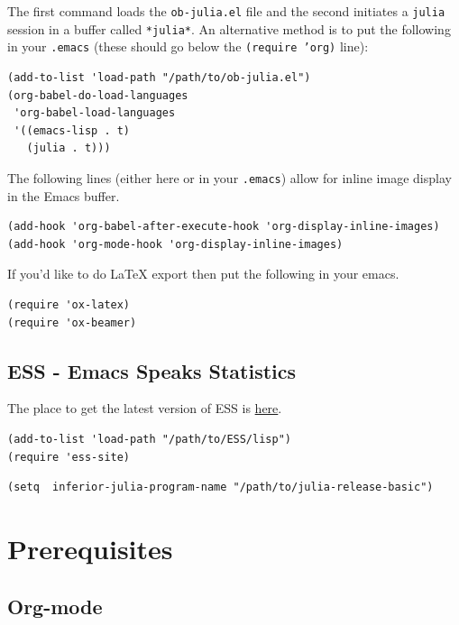 \documentclass[11pt]{article}
\begin{document}
The first command loads the \texttt{ob-julia.el} file and the second initiates a \texttt{julia} session in a buffer called \texttt{*julia*}.  An alternative method is to put the following in your \texttt{.emacs} (these should go below the \texttt{(require 'org)} line):

\begin{verbatim}
(add-to-list 'load-path "/path/to/ob-julia.el")
(org-babel-do-load-languages
 'org-babel-load-languages
 '((emacs-lisp . t)
   (julia . t)))
\end{verbatim}

The following lines (either here or in your \texttt{.emacs}) allow for inline image display in the Emacs buffer.

\begin{verbatim}
(add-hook 'org-babel-after-execute-hook 'org-display-inline-images)   
(add-hook 'org-mode-hook 'org-display-inline-images)
\end{verbatim}

If you'd like to do \LaTeX{} export then put the following in your emacs.

\begin{verbatim}
(require 'ox-latex)
(require 'ox-beamer)
\end{verbatim}
\subsection{ESS - Emacs Speaks Statistics}
\label{sec-1-4}

The place to get the latest version of ESS is \href{http://stat.ethz.ch/ESS/index.php?Section=download}{here}.  

\begin{verbatim}
(add-to-list 'load-path "/path/to/ESS/lisp")
(require 'ess-site)
\end{verbatim}

\begin{verbatim}
(setq  inferior-julia-program-name "/path/to/julia-release-basic")
\end{verbatim}

\section{Prerequisites}
\label{sec-2}

\subsection{Org-mode}
\label{sec-2-1}
\end{document}
